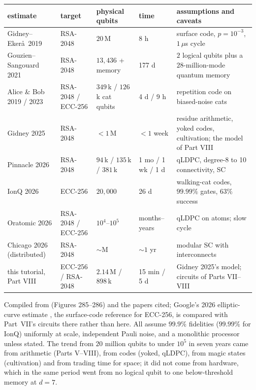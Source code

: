 \begin{center}\footnotesize
\renewcommand{\arraystretch}{1.12}
\begin{tabular}{@{}p{3.1cm}p{2.1cm}p{2.5cm}p{1.7cm}p{5.0cm}@{}}
\toprule
estimate & target & physical qubits & time & assumptions and caveats\\
\midrule
Gidney--Eker\aa\ 2019 \cite{gidney-ekera} & RSA-2048 & $20$\,M & 8 h & surface code, $p=10^{-3}$, $1\,\mu$s cycle\\
Gouzien--Sangouard 2021 & RSA-2048 & $13,436$ + memory & 177 d & $2$ logical qubits plus a $28$-million-mode quantum memory\\
Alice \& Bob 2019 / 2023 \cite{ph:cats19,ph:cats23} & RSA-2048 / ECC-256 & $349$\,k / $126$\,k cat qubits & 4 d / 9 h & repetition code on biased-noise cats\\
Gidney 2025 \cite{ec:gidney25rsa} & RSA-2048 & $<1$\,M & $<1$ week & residue arithmetic, yoked codes, cultivation; the model of Part VIII\\
Pinnacle 2026 \cite{ph:pinnacle26} & RSA-2048 & $94$\,k / $135$\,k / $381$\,k & 1 mo / 1 wk / 1 d & qLDPC, degree-8 to 10 connectivity, SC\\
IonQ 2026 \cite{ec:ionq26} & ECC-256 & $20,000$ & 26 d & walking-cat codes, $99.99\%$ gates, $63\%$ success\\
Oratomic 2026 & RSA-2048 / ECC-256 & $10^4$--$10^5$ & months--years & qLDPC on atoms; slow cycle\\
Chicago 2026 (distributed) & RSA-2048 & $\sim$M & $\sim1$ yr & modular SC with interconnects\\
this tutorial, Part VIII & ECC-256 / RSA-2048 & $2.14$\,M / $898$\,k & 15 min / 5 d & Gidney 2025's model; circuits of Parts VII--VIII\\
\bottomrule
\end{tabular}
\end{center}
\noindent Compiled from \cite{ph:uqt26} (Figures 285--286) and the papers cited; Google's 2026
elliptic-curve estimate \cite{ec:babbush26}, the surface-code reference for ECC-256, is compared
with Part~VII's circuits there rather than here. All assume
$99.9\%$ fidelities ($99.99\%$ for IonQ) uniformly at scale, independent Pauli noise, and a
monolithic processor unless stated. The trend from $20$ million qubits to under $10^5$ in seven
years came from arithmetic (Parts V--VIII), from codes (yoked, qLDPC), from magic states
(cultivation) and from trading time for space; it did not come from hardware, which in the same
period went from no logical qubit to one below-threshold memory at $d=7$.

